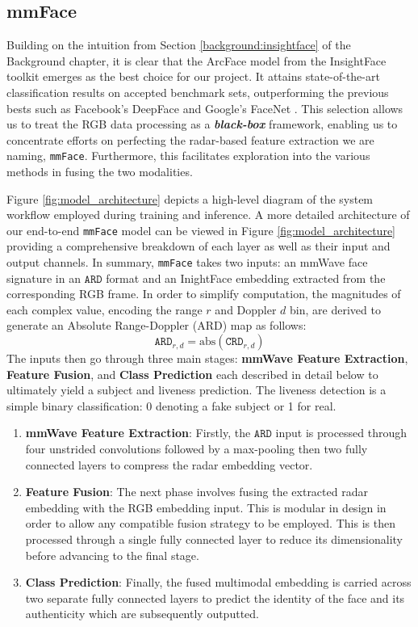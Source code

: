 \documentclass{mpaper}
\begin{document}
\subsection{mmFace}
Building on the intuition from Section \ref{background:insightface} of the Background chapter, it is clear that the ArcFace model from the InsightFace toolkit emerges as the best choice for our project. It attains state-of-the-art classification results on accepted benchmark sets, outperforming the previous bests such as Facebook's DeepFace \cite{taigman2014deepface} and Google's FaceNet \cite{schroff2015facenet}. This selection allows us to treat the RGB data processing as a \textbf{\textit{black-box}} framework, enabling us to concentrate efforts on perfecting the radar-based feature extraction we are naming, \texttt{mmFace}. Furthermore, this facilitates exploration into the various methods in fusing the two modalities. 

Figure \ref{fig:model_architecture} depicts a high-level diagram of the system workflow employed during training and inference. A more detailed architecture of our end-to-end \texttt{mmFace} model can be viewed in Figure \ref{fig:model_architecture} providing a comprehensive breakdown of each layer as well as their input and output channels. In summary, \texttt{mmFace} takes two inputs: an mmWave face signature in an $\mathtt{ARD}$ format and an InightFace embedding extracted from the corresponding RGB frame. In order to simplify computation, the magnitudes of each complex value, encoding the range $r$ and Doppler $d$ bin, are derived to generate an Absolute Range-Doppler (ARD) map as follows:
$$\mathtt{ARD}_{r,d} = \text{abs}(\mathtt{CRD}_{r,d})$$
The inputs then go through three main stages: \textbf{mmWave Feature Extraction}, \textbf{Feature Fusion}, and \textbf{Class Prediction} each described in detail below to ultimately yield a subject and liveness prediction. The liveness detection is a simple binary classification: 0 denoting a fake subject or 1 for real.
\vspace{-0.1cm}
\begin{enumerate}
    \itemsep0.01cm
    \item \textbf{mmWave Feature Extraction}: Firstly, the $\mathtt{ARD}$ input is processed through four unstrided convolutions followed by a max-pooling then two fully connected layers to compress the radar embedding vector. 
    \item \textbf{Feature Fusion}: The next phase involves fusing the extracted radar embedding with the RGB embedding input. This is modular in design in order to allow any compatible fusion strategy to be employed. This is then processed through a single fully connected layer to reduce its dimensionality before advancing to the final stage. 
    \item \textbf{Class Prediction}: Finally, the fused multimodal embedding is carried across two separate fully connected layers to predict the identity of the face and its authenticity which are subsequently outputted.
\end{enumerate}
\end{document}
